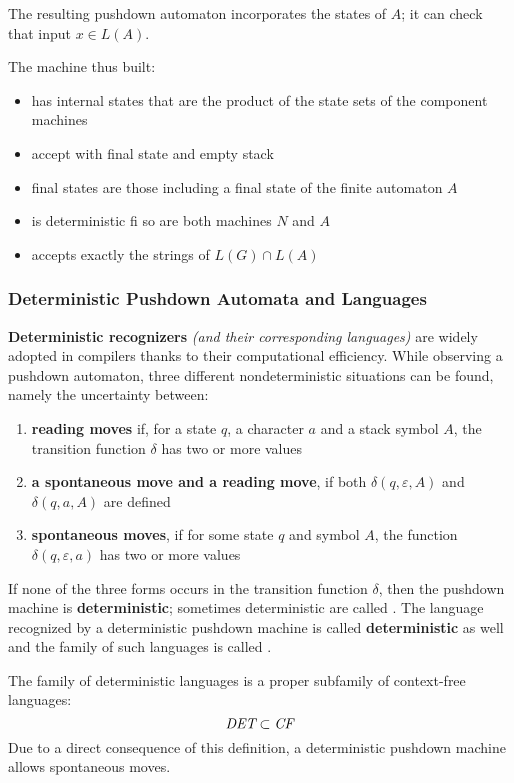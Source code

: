 \documentclass[english]{article}
\begin{document}
The resulting pushdown automaton incorporates the states of \(A\);
it can check that input \(x \in L(A)\).

The machine thus built:

\begin{itemize}
  \item has internal states that are the product of the state sets of the component machines
  \item accept with final state and empty stack
  \item final states are those including a final state of the finite automaton \(A\)
  \item is deterministic fi so are both machines \(N\) and \(A\)
  \item accepts exactly the strings of \(L(G) \cap L(A)\)
\end{itemize}

\subsubsection{Deterministic Pushdown Automata and Languages}

\textbf{Deterministic recognizers} \textit{(and their corresponding languages)} are widely adopted in compilers thanks to their computational efficiency.
While observing a pushdown automaton, three different nondeterministic situations can be found, namely the uncertainty between:

\begin{enumerate}
  \item \textbf{reading moves} if, for a state \(q\), a character \(a\) and a stack symbol \(A\), the transition function \(\delta\) has two or more values
  \item \textbf{a spontaneous move and a reading move}, if both \(\delta(q, \varepsilon, A)\) and \(\delta(q, a, A)\) are defined
  \item \textbf{spontaneous moves}, if for some state \(q\) and symbol \(A\), the function \(\delta(q, \varepsilon, a)\) has two or more values
\end{enumerate}

If none of the three forms occurs in the transition function \(\delta\), then the pushdown machine is \textbf{deterministic};
sometimes deterministic \PDA are called \DPDA.
The language recognized by a deterministic pushdown machine is called \textbf{deterministic} as well and the family of such languages is called \DET.

The family of deterministic languages is a proper subfamily of context-free languages:
\[ \textit{DET} \subset \textit{CF} \]
Due to a direct consequence of this definition, a deterministic pushdown machine allows spontaneous moves.
\end{document}
